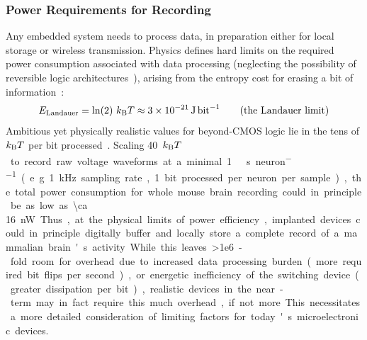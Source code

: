 \subsubsection{Power Requirements for Recording}

Any embedded system needs to process data, in preparation either for local storage or wireless transmission.
Physics defines hard limits on the required power consumption associated with data processing (neglecting the possibility of reversible logic architectures~\cite{bennett73}), arising from the entropy cost for erasing a bit of information~\cite{landauer61}:
\[E\sub{Landauer} = \ln(2)\ \kb T\approx \SI{3e-21}{\joule\per\bit} \label{eq:landauer} \tag{the Landauer limit}\]
Ambitious yet physically realistic values for beyond-CMOS logic lie in the tens of $k_{\text{\scriptsize B}} T$ per bit processed~\cite{yablonovitch08}.
Scaling \SI{40}{$k_{\text{\scriptsize B}} T$\per\bit} to record raw voltage waveforms at a minimal \SI{1}{\kilo\bit\per\second\per neuron} (e.g. \SI{1}{\kilo\hertz} sampling rate, 1 bit processed per neuron per sample), the total power consumption for whole mouse brain recording could in principle be as low as \SI{\ca 16}{\nano\watt}.
Thus, at the physical limits of power efficiency, implanted devices could in principle digitally buffer and locally store a complete record of a mammalian brain's activity.
While this leaves \num{>1e6}-fold room for overhead due to increased data processing burden (more required bit flips per second), or energetic inefficiency of the switching device (greater dissipation per bit), realistic devices in the near-term may in fact require this much overhead, if not more.
This necessitates a more detailed consideration of limiting factors for today's microelectronic devices.


